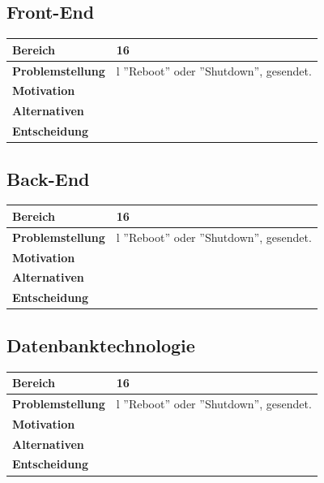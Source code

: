\subsection{Front-End}
\begin{longtable}{| p{4cm} | p{11.7cm} |}
 \hline
  \textbf{Bereich} & 16\\ \hline 
 \textbf{Problemstellung} & l ''Reboot'' oder ''Shutdown'', gesendet.\\ \hline 
 \textbf{Motivation} &  \\ \hline
 \textbf{Alternativen} &  \\ \hline
 \textbf{Entscheidung} &
\end{longtable}

\subsection{Back-End}
\begin{longtable}{| p{4cm} | p{11.7cm} |}
 \hline
  \textbf{Bereich} & 16\\ \hline 
 \textbf{Problemstellung} & l ''Reboot'' oder ''Shutdown'', gesendet.\\ \hline 
 \textbf{Motivation} &  \\ \hline
 \textbf{Alternativen} &  \\ \hline
 \textbf{Entscheidung} &
\end{longtable}


\subsection{Datenbanktechnologie}

\begin{longtable}{| p{4cm} | p{11.7cm} |}
 \hline
  \textbf{Bereich} & 16\\ \hline 
 \textbf{Problemstellung} & l ''Reboot'' oder ''Shutdown'', gesendet.\\ \hline 
 \textbf{Motivation} &  \\ \hline
 \textbf{Alternativen} &  \\ \hline
 \textbf{Entscheidung} &
\end{longtable}

